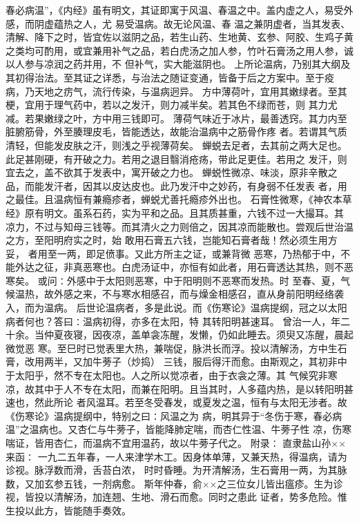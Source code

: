 \documentclass[a4paper,12pt,UTF8,twoside]{ctexbook}
\begin{document}
春必病温”，《内经》虽有明文，其证即寓于风温、春温之中。盖内虚之人，易受外感，而阴虚蕴热之人，尤 
易受温病。故无论风温、春 
温之兼阴虚者，当其发表、清解、降下之时，皆宜佐以滋阴之品，若生山药、生地黄、玄参、阿胶、生鸡子黄 
之类均可酌用，或宜兼用补气之品，若白虎汤之加人参，竹叶石膏汤之用人参，诚以人参与凉润之药并用，不 
但补气，实大能滋阴也。 
上所论温病，乃别其大纲及其初得治法。至其证之详悉，与治法之随证变通，皆备于后之方案中。至于疫 
病，乃天地之疠气，流行传染，与温病迥异。 
方中薄荷叶，宜用其嫩绿者。至其梗，宜用于理气药中，若以之发汗，则力减半矣。若其色不绿而苍，则 
其力尤减。若果嫩绿之叶，方中用三钱即可。 
薄荷气味近于冰片，最善透窍。其力内至脏腑筋骨，外至腠理皮毛，皆能透达，故能治温病中之筋骨作疼 
者。若谓其气质清轻，但能发皮肤之汗，则浅之乎视薄荷矣。 
蝉蜕去足者，去其前之两大足也。此足甚刚硬，有开破之力。若用之退目翳消疮疡，带此足更佳。若用之 
发汗，则宜去之，盖不欲其于发表中，寓开破之力也。 
蝉蜕性微凉、味淡，原非辛散之品，而能发汗者，因其以皮达皮也。此乃发汗中之妙药，有身弱不任发表 
者，用之最佳。且温病恒有兼瘾疹者，蝉蜕尤善托瘾疹外出也。 
石膏性微寒，《神农本草经》原有明文。虽系石药，实为平和之品。且其质甚重，六钱不过一大撮耳。其 
凉力，不过与知母三钱等。而其清火之力则倍之，因其凉而能散也。尝观后世治温之方，至阳明府实之时，始 
敢用石膏五六钱，岂能知石膏者哉！然必须生用方妥， 者用至一两，即足偾事。又此方所主之证，或兼背微 
恶寒，乃热郁于中，不能外达之征，非真恶寒也。白虎汤证中，亦恒有如此者，用石膏透达其热，则不恶寒矣。 
或问∶外感中于太阳则恶寒，中于阳明则不恶寒而发热。时 
至春、夏，气候温热，故外感之来，不与寒水相感召，而与燥金相感召，直从身前阳明经络袭入，而为温病。 
后世论温病者，多是此说。而《伤寒论》温病提纲，冠之以太阳病者何也？答曰∶温病初得，亦多在太阳，特 
其转阳明甚速耳。 
曾治一人，年二十余。当仲夏夜寝，因夜凉，盖单衾冻醒，发懒，仍如此睡去。须臾又冻醒，晨起微觉恶 
寒。至巳时已觉表里大热，兼喘促，脉洪长而浮。投以清解汤，方中生石膏，改用两半，又加牛蒡子（炒捣） 
三钱，服后得汗而愈。由斯观之，其初非中于太阳乎，然不专在太阳也。人之所以觉凉者，由于衣衾之薄。其 
气候究非寒凉，故其中于人不专在太阳，而兼在阳明。且当其时，人多蕴内热，是以转阳明甚速也，然此所论 
者风温耳。若至冬受春发，或夏发之温，恒有与太阳无涉者。故《伤寒论》温病提纲中，特别之曰∶风温之为 
病，明其异于“冬伤于寒，春必病温”之温病也。又杏仁与牛蒡子，皆能降肺定喘，而杏仁性温、牛蒡子性 
凉，伤寒喘证，皆用杏仁，而温病不宜用温药，故以牛蒡子代之。 
附录∶ 
直隶盐山孙××来函∶ 
一九二五年春，一人来津学木工。因身体单薄，又兼天热，得温病，请为诊视。脉浮数而滑，舌苔白浓， 
时时昏睡。为开清解汤，生石膏用一两，为其脉数，又加玄参五钱，一剂病愈。 
斯年仲春，俞××之三位女儿皆出瘟疹。生为诊视，皆投以清解汤，加连翘、生地、滑石而愈。同时之患此 
证者，势多危险。惟生投以此方，皆能随手奏效。 
\end{document}
